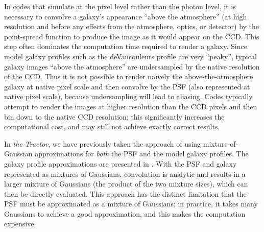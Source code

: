 \documentclass[11pt,preprint]{aastex}
\newcommand{\project}[1]{\textsl{#1}}
\begin{document}
In codes that simulate at the pixel level rather than the photon
level, it is necessary to convolve a galaxy's appearance ``above the
atmosphere'' (at high resolution and before any effects from the
atmosphere, optics, or detector) by the point-spread function to
produce the image as it would appear on the CCD.  This step often
dominates the computation time required to render a galaxy.  Since
model galaxy profiles such as the deVaucouleurs profile are very
``peaky'', typical galaxy images ``above the atmosphere'' are
undersampled by the native resolution of the CCD.  Thus it is not
possible to render na\"ively the above-the-atmosphere galaxy at native
pixel scale and then convolve by the PSF (also represented at native
pixel scale), because undersampling will lead to aliasing.  Codes
typically attempt to render the images at higher resolution than the
CCD pixels and then bin down to the native CCD resolution; this
significantly increases the computational cost, and may still not
achieve exactly correct results.

In \project{the Tractor}, we have previously taken the approach of
using mixture-of-Gaussian approximations for \emph{both} the PSF and
the model galaxy profiles.  The galaxy profile approximations are
presented in \cite{moggalaxy}.  With the PSF and galaxy represented as
mixtures of Gaussians, convolution is analytic and results in a larger
mixture of Gaussians (the product of the two mixture sizes), which can
then be directly evaluated.  This approach has the distinct limitation
that the PSF must be approximated as a mixture of Gaussians; in
practice, it takes many Gaussians to achieve a good approximation, and
this makes the computation expensive.
\end{document}
